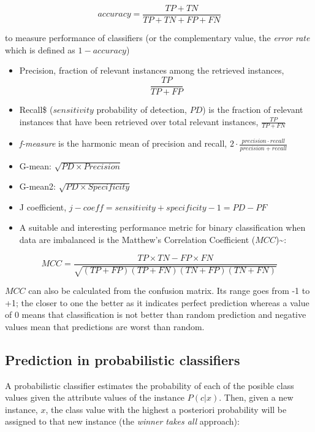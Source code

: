 \documentclass[
]{book}
\begin{document}
\[accuracy = \frac{TP + TN}{TP + TN + FP + FN}\]

to measure performance of classifiers (or the complementary value, the \emph{error rate} which is defined as \(1-accuracy\))

\begin{itemize}
\item
  Precision, fraction of relevant instances among the retrieved instances, \[\frac{TP}{TP+FP}\]
\item
  Recall\$ (\(sensitivity\) probability of detection, \(PD\)) is the fraction of relevant instances that have been retrieved over total relevant instances, \(\frac{TP}{TP+FN}\)
\item
  \emph{f-measure} is the harmonic mean of precision and recall,
  \(2 \cdot \frac{precision \cdot recall}{precision + recall}\)
\item
  G-mean: \(\sqrt{PD \times Precision}\)
\item
  G-mean2: \(\sqrt{PD \times Specificity}\)
\item
  J coefficient, \(j-coeff = sensitivity + specificity - 1 = PD-PF\)
\item
  A suitable and interesting performance metric for binary classification when data are imbalanced is the Matthew's Correlation Coefficient (\(MCC\))\textasciitilde{}\cite{Matthews1975Comparison}:
\end{itemize}

\[MCC=\frac{TP\times TN - FP\times FN}{\sqrt{(TP+FP)(TP+FN)(TN+FP)(TN+FN)}}\]

\(MCC\) can also be calculated from the confusion matrix. Its range goes from -1 to +1; the closer to one the better as it indicates perfect prediction whereas a value of 0 means that classification is not better than random prediction and negative values mean that predictions are worst than random.

\hypertarget{prediction-in-probabilistic-classifiers}{%
\subsection{Prediction in probabilistic classifiers}\label{prediction-in-probabilistic-classifiers}}

A probabilistic classifier estimates the probability of each of the posible class values given the attribute values of the instance \(P(c|{x})\). Then, given a new instance, \({x}\), the class value with the highest a posteriori probability will be assigned to that new instance (the \emph{winner takes all} approach):
\end{document}
